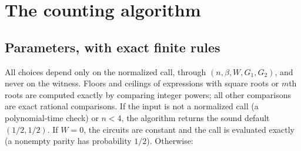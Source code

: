 \documentclass[11pt,letterpaper]{article}
\theoremstyle{definition}
\theoremstyle{remark}
\begin{document}
\section{The counting algorithm}\label{sec:algorithm}

\subsection{Parameters, with exact finite rules}\label{sec:params}
All choices depend only on the normalized call, through
\((n,\beta,W,G_1,G_2)\), and never on the witness. Floors and ceilings
of expressions with square roots or \(m\)th roots are computed exactly
by comparing integer powers; all other comparisons are exact rational
comparisons. If the input is not a normalized call (a polynomial-time check) or \(n<4\), the algorithm returns the sound default
\((1/2,1/2)\). If \(W=0\), the circuits are constant and the call is
evaluated exactly (a nonempty parity has probability \(1/2\)).
Otherwise:
\end{document}
